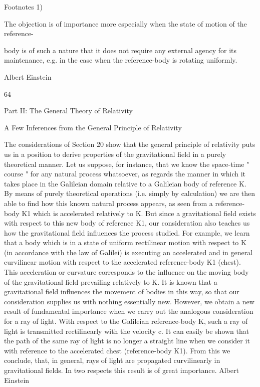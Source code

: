 \documentclass{article}
\begin{document}
Footnotes
1)

The objection is of importance more especially when the state of motion of the reference-

body is of such a nature that it does not require any external agency for its maintenance, e.g.
in the case when the reference-body is rotating uniformly.

Albert Einstein

64

Part II: The General Theory of Relativity

A Few Inferences from the
General Principle of Relativity

The considerations of Section 20 show that the general principle of relativity puts us in a
position to derive properties of the gravitational field in a purely theoretical manner. Let us
suppose, for instance, that we know the space-time " course " for any natural process
whatsoever, as regards the manner in which it takes place in the Galileian domain relative to
a Galileian body of reference K. By means of purely theoretical operations (i.e. simply by
calculation) we are then able to find how this known natural process appears, as seen from a
reference-body K1 which is accelerated relatively to K. But since a gravitational field exists
with respect to this new body of reference K1, our consideration also teaches us how the
gravitational field influences the process studied.
For example, we learn that a body which is in a state of uniform rectilinear motion with
respect to K (in accordance with the law of Galilei) is executing an accelerated and in
general curvilinear motion with respect to the accelerated reference-body K1 (chest). This
acceleration or curvature corresponds to the influence on the moving body of the
gravitational field prevailing relatively to K. It is known that a gravitational field influences
the movement of bodies in this way, so that our consideration supplies us with nothing
essentially new.
However, we obtain a new result of fundamental importance when we carry out the
analogous consideration for a ray of light. With respect to the Galileian reference-body K,
such a ray of light is transmitted rectilinearly with the velocity c. It can easily be shown that
the path of the same ray of light is no longer a straight line when we consider it with
reference to the accelerated chest (reference-body K1). From this we conclude, that, in
general, rays of light are propagated curvilinearly in gravitational fields. In two respects
this result is of great importance.
Albert Einstein
\end{document}
